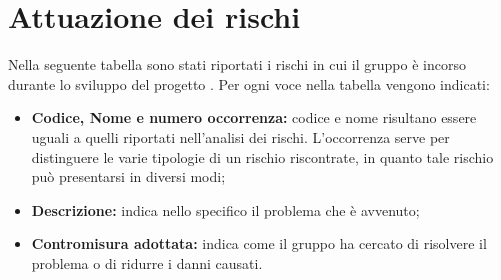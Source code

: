 \section{Attuazione dei rischi}

Nella seguente tabella sono stati riportati i rischi in cui il gruppo \Omicron{} è incorso durante lo sviluppo del progetto \nameproject{}.
Per ogni voce nella tabella vengono indicati:
\begin{itemize}
\item \textbf{Codice, Nome e numero occorrenza:} codice e nome risultano essere uguali a quelli riportati nell'analisi dei rischi. L'occorrenza serve per distinguere le varie tipologie di un rischio riscontrate, in quanto tale rischio può presentarsi in diversi modi;
\item \textbf{Descrizione:} indica nello specifico il problema che è avvenuto;
\item \textbf{Contromisura adottata:} indica come il gruppo ha cercato di risolvere il problema o di ridurre i danni causati.
\end{itemize}

